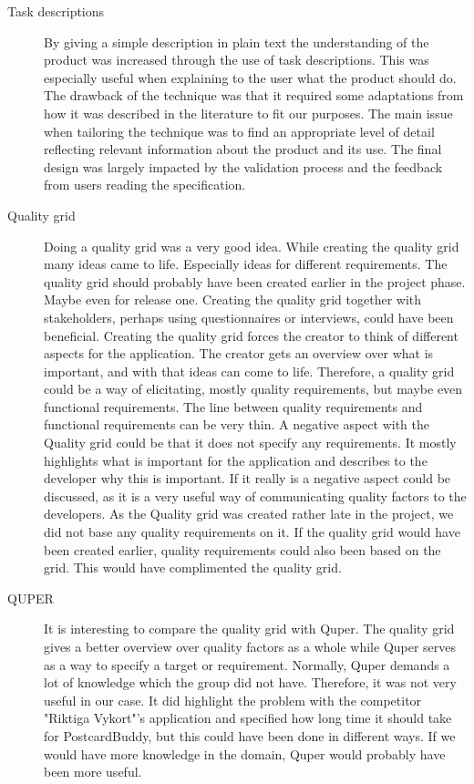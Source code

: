 \documentclass[10pt,a4paper]{article}
\begin{document}
\begin{description}
\item[Task descriptions] By giving a simple description in plain text the understanding of the product was increased through the use of task descriptions. This was especially useful when explaining to the user what the product should do. The drawback of the technique was that it required some adaptations from how it was described in the literature to fit our purposes. The main issue when tailoring the technique was to find an appropriate level of detail reflecting relevant information about the product and its use. The final design was largely impacted by the validation process and the feedback from users reading the specification. 

\item[Quality grid]
Doing a quality grid was a very good idea. While creating the quality grid many ideas came to life. Especially ideas for different requirements.
The quality grid should probably have been created earlier in the project phase. Maybe even for release one. Creating the quality grid together with stakeholders, perhaps using questionnaires or interviews, could have been beneficial. Creating the quality grid forces the creator to think of different aspects for the application. The creator gets an overview over what is important, and with that ideas can come to life. Therefore, a quality grid could be a way of elicitating, mostly quality requirements, but maybe even functional requirements. The line between quality requirements and functional requirements can be very thin. A negative aspect with the Quality grid could be that it does not specify any requirements. It mostly highlights what is important for the application and describes to the developer why this is important. If it really is a negative aspect could be discussed, as it is a very useful way of communicating quality factors to the developers. As the Quality grid was created rather late in the project, we did not base any quality requirements on it. If the quality grid would have been created earlier, quality requirements could also been based on the grid. This would have complimented the quality grid.


\item[QUPER]
It is interesting to compare the quality grid with Quper. The quality grid gives a better overview over quality factors as a whole while Quper serves as a way to specify a target or requirement. Normally, Quper demands a lot of knowledge which the group did not have. Therefore, it was not very useful in our case. It did highlight the problem with the competitor "Riktiga Vykort"'s application and specified how long time it should take for PostcardBuddy, but this could have been done in different ways. If we would have more knowledge in the domain, Quper would probably have been more useful.


\end{description}
\end{document}
